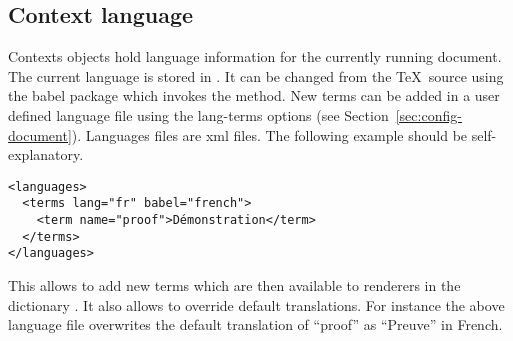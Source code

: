 \subsection{Context language}\label{sec:context-language}

Contexts objects hold language information for the currently running
document. The current language is stored in
. It can be changed from the \TeX\ source
using the babel package which invokes the 
method. New terms can be added in a user defined language file using the
lang-terms options (see Section~\ref{sec:config-document}). Languages
files are xml files. The following example should be self-explanatory.

\begin{verbatim}
<languages>
  <terms lang="fr" babel="french">
    <term name="proof">Démonstration</term>
  </terms>
</languages>
\end{verbatim}

This allows to add new terms which are then available to renderers in
the dictionary . It also allows to override default
translations. For instance the above language file overwrites the
default translation of ``proof'' as ``Preuve'' in French.
